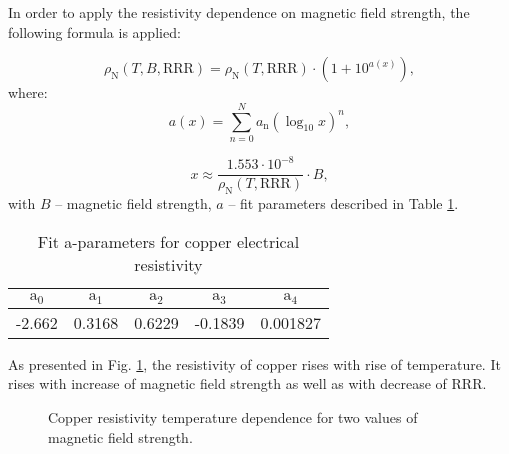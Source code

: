 In order to apply the resistivity dependence on magnetic field strength, the following formula is applied:

\begin{equation}
    \rho_\text{N}(T, B, \text{RRR}) = \rho_\text{N}(T, \text{RRR}) \cdot (1 + 10^{a(x)}),  
\end{equation}
where:
\begin{equation}
    a(x) = \sum_{n=0}^{N} a_\text{n}(\log_\text{10}x)^{n},
\end{equation}

\begin{equation}
    x \approx \frac{1.553 \cdot 10^{-8}}{\rho_\text{N}(T, \text{RRR})} \cdot B,
\end{equation}
with $B$ -- magnetic field strength, $a$ -- fit parameters described in Table \ref{table:nist_resistivity_parameters2}.

\begin{table}[h!]
    \caption{Fit a-parameters for copper electrical resistivity} 
    \vspace{-1.em} 
    \fontsize{10}{10}
    \selectfont 
    \renewcommand{\arraystretch}{1.5}
    \begin{center}
    \begin{tabular}{ ccccc }  
    $\text{a}_0$ & $\text{a}_1$ & $\text{a}_2$ & $\text{a}_3$ & $\text{a}_4$ \\
    \hline
    -2.662 & 0.3168 & 0.6229 & -0.1839 & 0.001827 \\
    \hline
    \end{tabular}
    \end{center}  
     \label{table:nist_resistivity_parameters2} 
 \end{table}

As presented in Fig. \ref{fig:cu_resistivity_plot}, the resistivity of copper rises with rise of temperature. It rises with increase of magnetic field strength as well as with decrease of RRR.

\begin{figure}[H]
\centering
{}
\caption{Copper resistivity temperature dependence for two values of magnetic field strength.}
    \label{fig:cu_resistivity_plot}
\end{figure}

